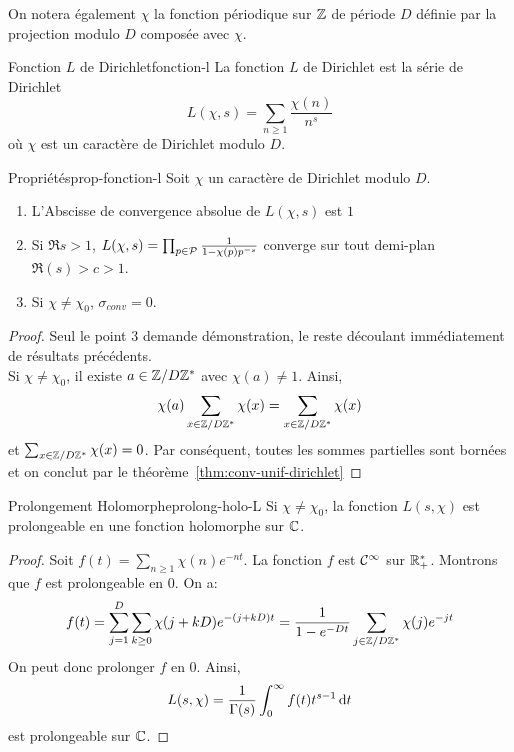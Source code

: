 \documentclass{cours}
\begin{document}
On notera également $\chi$ la fonction périodique sur $\mathbb{Z}$ de période $D$ définie par la projection modulo $D$ composée avec $\chi$. 

\begin{définition}
	{Fonction $L$ de Dirichlet}{fonction-l}
	La fonction $L$ de Dirichlet est la série de Dirichlet 
	\begin{equation*}
		L(\chi, s) = \sum_{n \geq 1}\frac{\chi(n)}{n^{s}}
	\end{equation*}
	où $\chi$ est un caractère de Dirichlet modulo $D$. 
\end{définition}

\begin{propositionfr}
	{Propriétés}{prop-fonction-l}
	Soit $\chi$ un caractère de Dirichlet modulo $D$. 
	\begin{enumerate}
		\item L'Abscisse de convergence absolue de $L(\chi, s)$ est $1$
		\item Si $\Re s > 1$, $L(\chi, s) = \prod_{p \in \mathcal{P}} \frac{1}{1 - \chi(p)p^{-s}}$ converge sur tout demi-plan $\Re(s) > c > 1$.
		\item Si $\chi \neq \chi_{0}$, $\sigma_{conv} = 0$.
	\end{enumerate}

\end{propositionfr}
\begin{proof}
	Seul le point 3 demande démonstration, le reste découlant immédiatement de résultats précédents.\\
	Si $\chi \neq \chi_{0}$, il existe $a \in \mathbb{Z}/D\mathbb{Z}^{*}$ avec $\chi(a) \neq 1$. Ainsi, 
	\begin{equation*}
		\chi(a) \sum_{x \in \mathbb{Z}/D\mathbb{Z}^{*}}\chi(x) = \sum_{x \in \mathbb{Z}/D\mathbb{Z}^{*}}\chi(x)
	\end{equation*}
	et $\sum_{x \in \mathbb{Z}/D\mathbb{Z}^{*}} \chi(x) = 0$. Par conséquent, toutes les sommes partielles sont bornées et on conclut par le théorème~\ref{thm:conv-unif-dirichlet}
\end{proof}

\begin{propositionfr}
	{Prolongement Holomorphe}{prolong-holo-L}
	Si $\chi \neq \chi_{0}$, la fonction $L(s, \chi)$ est prolongeable en une fonction holomorphe sur $\mathbb{C}$. 
\end{propositionfr}
\begin{proof}
	Soit $f(t) = \sum_{n \geq 1} \chi(n)e^{-nt}$. La fonction $f$ est $\mathcal{C}^{\infty}$ sur $\mathbb{R}_{+}^{*}$. Montrons que $f$ est prolongeable en $0$. On a: 
	\begin{equation*}
		f(t) = \sum_{j = 1}^{D}\sum_{k \geq 0} \chi(j + kD)e^{-(j + kD)t} = \frac{1}{1 - e^{-Dt}}\sum_{j \in \mathbb{Z}/D\mathbb{Z}^{*}}\chi(j)e^{-jt}
	\end{equation*}
	On peut donc prolonger $f$ en $0$. Ainsi, 
	\begin{equation*}
		L(s, \chi) = \frac{1}{\Gamma(s)}\int_{0}^{\infty}f(t)t^{s-1}{\rm \, d} t
	\end{equation*}
	est prolongeable sur $\mathbb{C}$. 
\end{proof}
\end{document}
